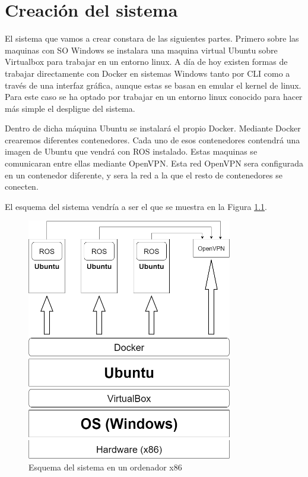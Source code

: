 \chapter{Creación del sistema}

El sistema que vamos a crear constara de las siguientes partes. Primero sobre las maquinas con SO Windows se instalara una maquina virtual Ubuntu sobre Virtualbox para trabajar en un entorno linux. A día de hoy existen formas de trabajar directamente con Docker en sistemas Windows tanto por CLI como a través de una interfaz gráfica, aunque estas se basan en emular el kernel de linux. Para este caso se ha optado por trabajar en un entorno linux conocido para hacer más simple el despligue del sistema.

Dentro de dicha máquina Ubuntu se instalará el propio Docker. Mediante Docker crearemos diferentes contenedores. Cada uno de esos contenedores contendrá una imagen de Ubuntu que vendrá con ROS instalado. Estas maquinas se comunicaran entre ellas mediante OpenVPN. Esta red OpenVPN sera configurada en un contenedor diferente, y sera la red a la que el resto de contenedores se conecten.

El esquema del sistema vendría a ser el que se muestra en la Figura \ref{fig:esquemaOriginal}.
\begin{figure}[H] %
	\centering
	\includegraphics[width=0.8\textwidth]{figuras/esquemaOriginal}
	\caption{Esquema del sistema en un ordenador x86}
	\label{fig:esquemaOriginal}
\end{figure}

